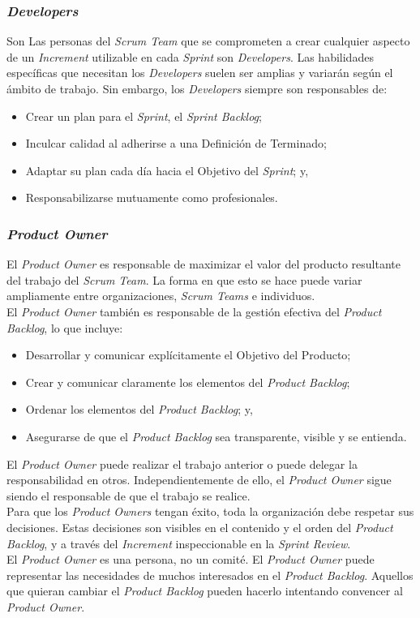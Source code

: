 \begin{spacing}{1.5}
		\subsubsection{\textit{Developers}}
			Son Las personas del \textit{Scrum Team} que se comprometen a crear cualquier aspecto de un \textit{Increment} utilizable en cada \textit{Sprint} son \textit{Developers}.
			Las habilidades específicas que necesitan los \textit{Developers} suelen ser amplias y variarán según el ámbito
			de trabajo. Sin embargo, los \textit{Developers} siempre son responsables de:
			\begin{itemize}
				\item Crear un plan para el \textit{Sprint}, el \textit{Sprint Backlog};
				\item Inculcar calidad al adherirse a una Definición de Terminado;
				\item Adaptar su plan cada día hacia el Objetivo del \textit{Sprint}; y,
				\item Responsabilizarse mutuamente como profesionales.
			\end{itemize}
		\subsubsection{\textit{Product Owner}}
			El \textit{Product Owner} es responsable de maximizar el valor del producto resultante del trabajo del \textit{Scrum Team}. La forma en que esto se hace puede variar ampliamente entre organizaciones, \textit{Scrum Teams} e individuos.\\
			El \textit{Product Owner} también es responsable de la gestión efectiva del \textit{Product Backlog}, lo que incluye:
			\begin{itemize}
				\item Desarrollar y comunicar explícitamente el Objetivo del Producto;
				\item Crear y comunicar claramente los elementos del \textit{Product Backlog};
				\item Ordenar los elementos del \textit{Product Backlog}; y,
				\item Asegurarse de que el \textit{Product Backlog} sea transparente, visible y se entienda.
			\end{itemize}
			El \textit{Product Owner} puede realizar el trabajo anterior o puede delegar la responsabilidad en otros. Independientemente de ello, el \textit{Product Owner} sigue siendo el responsable de que el trabajo se realice.\\
			Para que los \textit{Product Owners} tengan éxito, toda la organización debe respetar sus decisiones. Estas decisiones son visibles en el contenido y el orden del \textit{Product Backlog}, y a través del \textit{Increment} inspeccionable en la \textit{Sprint Review}.\\
			El \textit{Product Owner} es una persona, no un comité. El \textit{Product Owner} puede representar las necesidades de muchos interesados en el \textit{Product Backlog}. Aquellos que quieran cambiar el \textit{Product Backlog} pueden hacerlo intentando convencer al \textit{Product Owner}.

\end{spacing}
